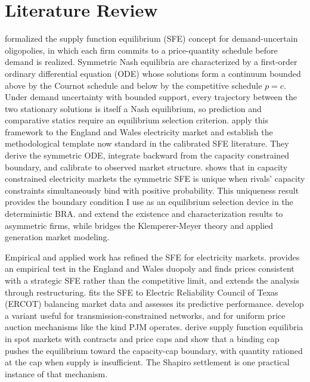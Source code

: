 
\section{Literature Review}
\label{sec:literature}

\citet{Klemperer1989_sfe} formalized the supply function equilibrium
(SFE) concept for demand-uncertain oligopolies, in which each firm
commits to a price-quantity schedule before demand is realized.
Symmetric Nash equilibria are characterized by a first-order
ordinary differential equation (ODE) whose solutions form a continuum bounded above
by the Cournot schedule and below by the competitive schedule
$p = c$. Under demand uncertainty with bounded support, every
trajectory between the two stationary solutions is itself a Nash
equilibrium, so prediction and comparative statics require an
equilibrium selection criterion. \citet{Green1992_british} apply this
framework to the England and Wales electricity market and establish
the methodological template now standard in the calibrated SFE
literature. They derive the symmetric ODE, integrate backward from
the capacity constrained boundary, and calibrate to observed market
structure. \citet{Holmberg2008_unique_sfe} shows that in
capacity constrained electricity markets the symmetric SFE is unique
when rivals' capacity constraints simultaneously bind with positive
probability. This uniqueness result provides the boundary condition I
use as an equilibrium selection device in the deterministic BRA.
\citet{Anderson2008_sfe_asymmetric} and \citet{Holmberg2007_asymmetric}
extend the existence and characterization results to asymmetric
firms, while \citet{Rudkevich1998_poolco} bridges the
Klemperer-Meyer theory and applied generation market modeling.

Empirical and applied work has refined the SFE for electricity
markets. \citet{Wolfram1999_duopoly} provides an empirical
test in the England and Wales duopoly and finds prices consistent
with a strategic SFE rather than the competitive limit, and
\citet{Sweeting2007_market_power} extends the analysis through
restructuring. \citet{Sioshansi2007_sfe_ercot} fits the SFE to Electric Reliability
Council of Texas (ERCOT) balancing market data and assesses its
predictive performance.
\citet{Baldick2004_linear_sfe} develop a variant useful for transmission-constrained networks,
and \citet{Vasin2016_sfe_uniform} for uniform price auction mechanisms like the kind PJM operates.
\citet{Anderson2005_sfe_pricecaps} derive supply function
equilibria in spot markets with contracts and price caps and show
that a binding cap pushes the equilibrium toward the capacity-cap
boundary, with quantity rationed at the cap when supply is
insufficient. The Shapiro settlement is one practical instance of
that mechanism.

